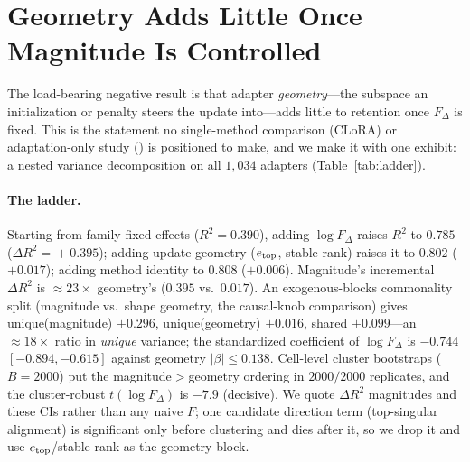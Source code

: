 \documentclass[11pt]{article}
\newcommand{\dw}{F_{\Delta}}
\begin{document}
\section{Geometry Adds Little Once Magnitude Is Controlled}\label{sec:geometry}
The load-bearing negative result is that adapter \emph{geometry}---the subspace an
initialization or penalty steers the update into---adds little to retention once
$\dw$ is fixed. This is the statement no single-method comparison
(CLoRA) or adaptation-only study (\citealp{lee2026lr}) is positioned to make, and
we make it with one exhibit: a nested variance decomposition on all $1{,}034$
adapters (Table~\ref{tab:ladder}).



\paragraph{The ladder.} Starting from family fixed effects ($R^2\!=\!0.390$),
adding $\log\dw$ raises $R^2$ to $0.785$ ($\Delta R^2\!=\!+0.395$); adding update
geometry ($e_{\rm top}$, stable rank) raises it to $0.802$ ($+0.017$); adding
method identity to $0.808$ ($+0.006$). Magnitude's incremental $\Delta R^2$ is
$\approx\!23\times$ geometry's ($0.395$ vs.\ $0.017$). An exogenous-blocks
commonality split (magnitude vs.\ shape geometry, the causal-knob comparison)
gives unique(magnitude) $+0.296$, unique(geometry) $+0.016$, shared $+0.099$---an
$\approx\!18\times$ ratio in \emph{unique} variance; the standardized
coefficient of $\log\dw$ is $-0.744$ $[-0.894,-0.615]$ against geometry
$|\beta|\!\le\!0.138$. Cell-level cluster bootstraps ($B\!=\!2000$) put the
magnitude${>}$geometry ordering in $2000/2000$ replicates, and the
cluster-robust $t(\log\dw)$ is $-7.9$ (decisive). We quote $\Delta R^2$
magnitudes and these CIs rather than any naive $F$; one candidate direction term
(top-singular alignment) is significant only before clustering and dies after it,
so we drop it and use $e_{\rm top}$/stable rank as the geometry block.
\end{document}
